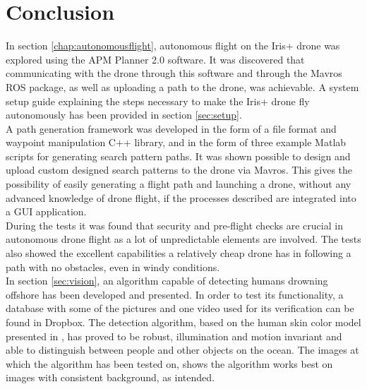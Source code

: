 \chapter{Conclusion}

In section \ref{chap:autonomousflight}, autonomous flight on the Iris+ drone was explored using the APM Planner 2.0 software.
It was discovered that communicating with the drone through this software and through the Mavros ROS package,
as well as uploading a path to the drone, was achievable.
A system setup guide explaining the steps necessary to make the Iris+ drone fly autonomously has been provided in section \ref{sec:setup}.
\\
A path generation framework was developed in the form of a file format and waypoint manipulation C++ library,
and in the form of three example Matlab scripts for generating search pattern paths.
It was shown possible to design and upload custom designed search patterns to the drone via Mavros.
This gives the possibility of easily generating a flight path and launching a drone, without any advanced knowledge of drone flight,
if the processes described are integrated into a GUI application.\\

During the tests it was found that security and pre-flight checks are crucial in autonomous drone flight
as a lot of unpredictable elements are involved.
The tests also showed the excellent capabilities a relatively cheap drone has in following a path with no obstacles, even in windy conditions.\\

In section \ref{sec:vision}, an algorithm capable of detecting humans drowning offshore has been developed and presented.
In order to test its functionality, a database with some of the pictures and one video used for its verification can be found in Dropbox.
The detection algorithm, based on the human skin color model presented in \cite{Ref:SkinDetection}, has proved to be robust, illumination and motion invariant and able to distinguish between people and other objects on the ocean. 
The images at which the algorithm has been tested on, shows the algorithm works best on images with consistent background, as intended.
\newpage